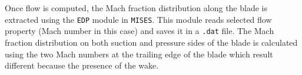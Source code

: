 Once flow is computed, the Mach fraction distribution along the blade is extracted using the \texttt{EDP} module in \texttt{MISES}. 
This module reads selected flow property (Mach number in this case) and saves it in a \texttt{.dat} file. The Mach fraction distribution on both suction and pressure sides of the blade is calculated using the two Mach numbers at the trailing edge of the blade which result different because the presence of the wake.
